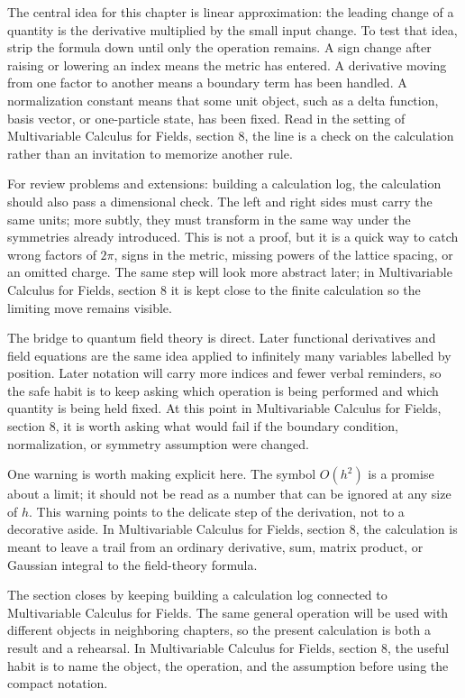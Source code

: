 The central idea for this chapter is linear approximation: the leading change of a quantity is the derivative multiplied by the small input change.  To test that idea, strip the formula down until only the operation remains.  A sign change after raising or lowering an index means the metric has entered.  A derivative moving from one factor to another means a boundary term has been handled.  A normalization constant means that some unit object, such as a delta function, basis vector, or one-particle state, has been fixed.  Read in the setting of Multivariable Calculus for Fields, section 8, the line is a check on the calculation rather than an invitation to memorize another rule.

For review problems and extensions: building a calculation log, the calculation should also pass a dimensional check.  The left and right sides must carry the same units; more subtly, they must transform in the same way under the symmetries already introduced.  This is not a proof, but it is a quick way to catch wrong factors of \(2\pi\), signs in the metric, missing powers of the lattice spacing, or an omitted charge.  The same step will look more abstract later; in Multivariable Calculus for Fields, section 8 it is kept close to the finite calculation so the limiting move remains visible.

The bridge to quantum field theory is direct.  Later functional derivatives and field equations are the same idea applied to infinitely many variables labelled by position.  Later notation will carry more indices and fewer verbal reminders, so the safe habit is to keep asking which operation is being performed and which quantity is being held fixed.  At this point in Multivariable Calculus for Fields, section 8, it is worth asking what would fail if the boundary condition, normalization, or symmetry assumption were changed.

One warning is worth making explicit here.  The symbol \(O(h^2)\) is a promise about a limit; it should not be read as a number that can be ignored at any size of \(h\).  This warning points to the delicate step of the derivation, not to a decorative aside.  In Multivariable Calculus for Fields, section 8, the calculation is meant to leave a trail from an ordinary derivative, sum, matrix product, or Gaussian integral to the field-theory formula.

The section closes by keeping building a calculation log connected to Multivariable Calculus for Fields.  The same general operation will be used with different objects in neighboring chapters, so the present calculation is both a result and a rehearsal.  In Multivariable Calculus for Fields, section 8, the useful habit is to name the object, the operation, and the assumption before using the compact notation.



